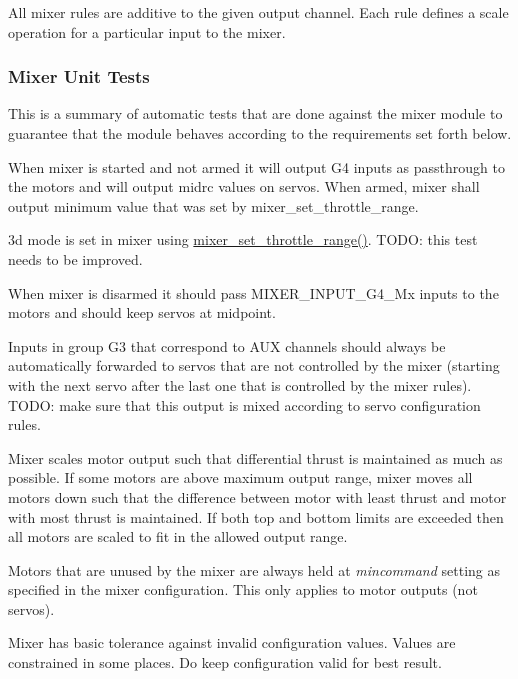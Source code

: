 All mixer rules are additive to the given output channel. Each rule defines a scale operation for a particular input to the mixer.

\subsubsection*{Mixer Unit Tests }

This is a summary of automatic tests that are done against the mixer module to guarantee that the module behaves according to the requirements set forth below.


\begin{DoxyItemize}
\item When mixer is started and not armed it will output G4 inputs as passthrough to the motors and will output midrc values on servos. When armed, mixer shall output minimum value that was set by mixer\+\_\+set\+\_\+throttle\+\_\+range.
\item 3d mode is set in mixer using \hyperlink{group__MIXER_gabff36b1d8ccaf72b089c8776573a00e8}{mixer\+\_\+set\+\_\+throttle\+\_\+range()}. T\+O\+D\+O\+: this test needs to be improved.
\item When mixer is disarmed it should pass M\+I\+X\+E\+R\+\_\+\+I\+N\+P\+U\+T\+\_\+\+G4\+\_\+\+Mx inputs to the motors and should keep servos at midpoint.
\item Inputs in group G3 that correspond to A\+U\+X channels should always be automatically forwarded to servos that are not controlled by the mixer (starting with the next servo after the last one that is controlled by the mixer rules). T\+O\+D\+O\+: make sure that this output is mixed according to servo configuration rules.
\item Mixer scales motor output such that differential thrust is maintained as much as possible. If some motors are above maximum output range, mixer moves all motors down such that the difference between motor with least thrust and motor with most thrust is maintained. If both top and bottom limits are exceeded then all motors are scaled to fit in the allowed output range.
\item Motors that are unused by the mixer are always held at {\itshape mincommand} setting as specified in the mixer configuration. This only applies to motor outputs (not servos).
\item Mixer has basic tolerance against invalid configuration values. Values are constrained in some places. Do keep configuration valid for best result. 
\end{DoxyItemize}

